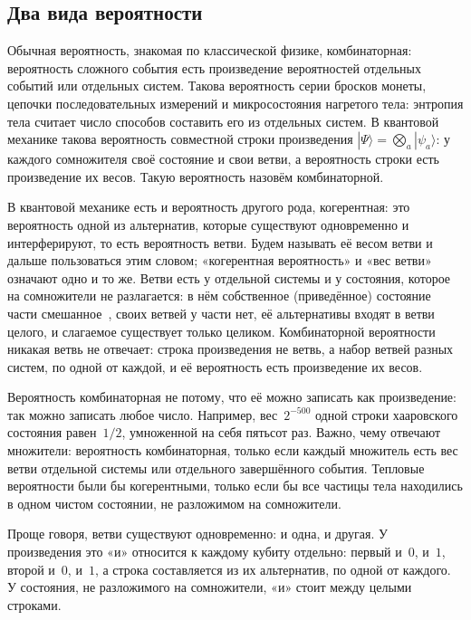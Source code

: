 \documentclass[11pt,a4paper]{article}
\begin{document}
\subsection{Два вида вероятности}
\label{sec:two-kinds}

Обычная вероятность, знакомая по классической физике, комбинаторная: вероятность сложного события есть произведение вероятностей отдельных событий или отдельных систем. Такова вероятность серии бросков монеты, цепочки последовательных измерений и микросостояния нагретого тела: энтропия тела считает число способов составить его из отдельных систем. В квантовой механике такова вероятность совместной строки произведения $|\Psi\rangle=\bigotimes_a|\psi_a\rangle$: у каждого сомножителя своё состояние и свои ветви, а вероятность строки есть произведение их весов. Такую вероятность назовём комбинаторной.

В квантовой механике есть и вероятность другого рода, когерентная: это вероятность одной из альтернатив, которые существуют одновременно и интерферируют, то есть вероятность ветви. Будем называть её весом ветви и дальше пользоваться этим словом; «когерентная вероятность» и «вес ветви» означают одно и то же. Ветви есть у отдельной системы и у состояния, которое на сомножители не разлагается: в нём собственное (приведённое) состояние части смешанное~\cite{nielsenchuang2010}, своих ветвей у части нет, её альтернативы входят в ветви целого, и слагаемое существует только целиком. Комбинаторной вероятности никакая ветвь не отвечает: строка произведения не ветвь, а набор ветвей разных систем, по одной от каждой, и её вероятность есть произведение их весов.

Вероятность комбинаторная не потому, что её можно записать как произведение: так можно записать любое число. Например, вес~$2^{-500}$ одной строки хааровского состояния равен~$1/2$, умноженной на себя пятьсот раз. Важно, чему отвечают множители: вероятность комбинаторная, только если каждый множитель есть вес ветви отдельной системы или отдельного завершённого события. Тепловые вероятности были бы когерентными, только если бы все частицы тела находились в одном чистом состоянии, не разложимом на сомножители.

Проще говоря, ветви существуют одновременно: и одна, и другая. У произведения это «и» относится к каждому кубиту отдельно: первый и~$0$, и~$1$, второй и~$0$, и~$1$, а строка составляется из их альтернатив, по одной от каждого. У состояния, не разложимого на сомножители, «и» стоит между целыми строками.
\end{document}
